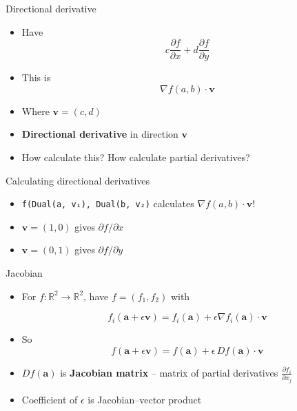 \begin{frame}{Directional derivative}
\protect\hypertarget{directional-derivative}{}

\begin{itemize}
\item
  Have
  \[c \frac{\partial f}{\partial x} + d  \frac{\partial f}{\partial y}\]
\item
  This is \[\nabla f(a, b) \cdot \mathbf{v}\]
\item
  Where \(\mathbf{v} = (c, d)\)
\item
  \textbf{Directional derivative} in direction \(\mathbf{v}\)
\item
  How calculate this? How calculate partial derivatives?
\end{itemize}

\end{frame}

\begin{frame}[fragile]{Calculating directional derivatives}
\protect\hypertarget{calculating-directional-derivatives}{}

\begin{itemize}
\item
  \texttt{f(Dual(a,\ v₁),\ Dual(b,\ v₂)} calculates
  \(\nabla f(a, b) \cdot \mathbf{v}\)!
\item
  \(\mathbf{v} = (1, 0)\) gives \(\partial f / \partial x\)
\item
  \(\mathbf{v} = (0, 1)\) gives \(\partial f / \partial y\)
\end{itemize}

\end{frame}

\begin{frame}{Jacobian}
\protect\hypertarget{jacobian}{}

\begin{itemize}
\item
  For \(f: \mathbb{R}^2 \to \mathbb{R}^2\), have \(f = (f_1, f_2)\) with

  \[f_i(\mathbf{a} + \epsilon \mathbf{v}) = f_i(\mathbf{a}) + \epsilon \nabla f_i(\mathbf{a}) \cdot \mathbf{v}\]
\item
  So
  \[f(\mathbf{a} + \epsilon \mathbf{v}) = f(\mathbf{a}) + \epsilon \, Df(\mathbf{a}) \cdot \mathbf{v}\]
\item
  \(Df(\mathbf{a})\) is \textbf{Jacobian matrix} -- matrix of partial
  derivatives \(\frac{\partial f_i}{\partial x_j}\)
\item
  Coefficient of \(\epsilon\) is Jacobian--vector product
\end{itemize}

\end{frame}

